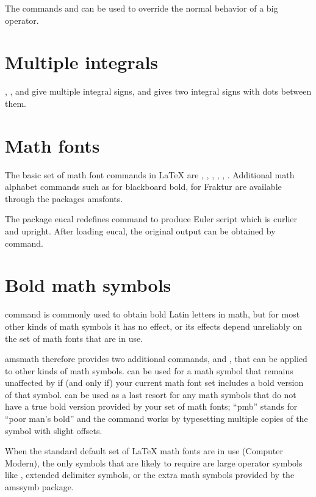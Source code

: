 \documentclass[a4paper,oneside]{book}
\newcommand{\dq}[1]{``#1''}
\newcommand{\package}[1]{\textsf{#1}}
\newcommand{\command}[1]{\PVerb{#1}}
\begin{document}
The commands \command{\limits} and \command{\nolimits} can be used to override the normal behavior of a big operator.

\section{Multiple integrals}
\command{\iint}, \command{\iiint}, and \command{\iiiint} give multiple integral signs, and \command{\idotsint}  gives two integral signs with dots between them.

\section{Math fonts}
The basic set of math font commands in \LaTeX{} are \command{\mathbf}, \command{\mathrm}, \command{\mathcal}, \command{\mathsf}, \command{\mathtt}, \command{\mathit}. Additional math alphabet commands such as \command{\mathbb} for blackboard bold, \command{\mathfrak} for Fraktur are available through the packages \package{amsfonts}.

The package \package{eucal} redefines \command{\mathcal} command to produce Euler script which is curlier and upright. After loading \package{eucal}, the original output can be obtained by \command{\CMcal} command.

\section{Bold math symbols}
\command{\mathbf} command is commonly used to obtain bold Latin letters in math, but for most other kinds of math symbols it has no effect, or its effects depend unreliably on the set of math fonts that are in use.

\package{amsmath} therefore provides two additional commands, \command{\boldsymbol} and \command{\pmb}, that can be applied to other kinds of math symbols. \command{\boldsymbol} can be used for a math symbol that remains unaffected by \command{\mathbf} if (and only if) your current math font set includes a bold version of that symbol. \command{\pmb} can be used as a last resort for any math symbols that do not have a true bold version provided by your set of math fonts; \dq{pmb} stands for \dq{poor man’s bold} and the command works by typesetting multiple copies of the symbol with slight offsets.

When the standard default set of \LaTeX{} math fonts are in use (Computer Modern), the only symbols that are likely to require \command{\pmb} are large operator symbols like \command{\sum}, extended delimiter symbols, or the extra math symbols provided by the \package{amssymb} package.
\end{document}
